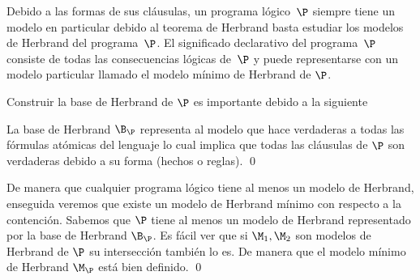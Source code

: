 \documentclass[11pt,letterpaper]{article}
\begin{document}
Debido a las formas de sus cl\'ausulas, un programa l\'ogico~$\P$ siempre
tiene un modelo en particular debido al teorema de Herbrand basta
estudiar los modelos de Herbrand del programa~$\P$. El significado
declarativo del programa~$\P$ consiste de todas las consecuencias
l\'ogicas de~$\P$ y puede representarse con un modelo particular llamado
el modelo m\'inimo de Herbrand de $\P$.




Construir la base de Herbrand de $\P$ es importante debido a la siguiente

\proof
La base de Herbrand $\B_\P$ representa al modelo que hace verdaderas a todas
las f\'ormulas at\'omicas del lenguaje lo cual implica que todas las cl\'ausulas
de $\P$ son verdaderas debido a su forma (hechos o reglas). 
\qed

\medskip

De manera que cualquier programa l\'ogico tiene al menos un modelo de Herbrand, 
enseguida veremos que existe un modelo de Herbrand m\'inimo con respecto a la 
contenci\'on.
\proof
Sabemos que $\P$ tiene al menos un modelo de Herbrand representado por
la base de Herbrand $\B_\P$. Es f\'acil ver que si $\M_1,\M_2$ son modelos de 
Herbrand de $\P$ su intersecci\'on tambi\'en lo es. De manera que el modelo 
m\'inimo de Herbrand $\M_\P$ est\'a bien definido.
\qed
\end{document}
